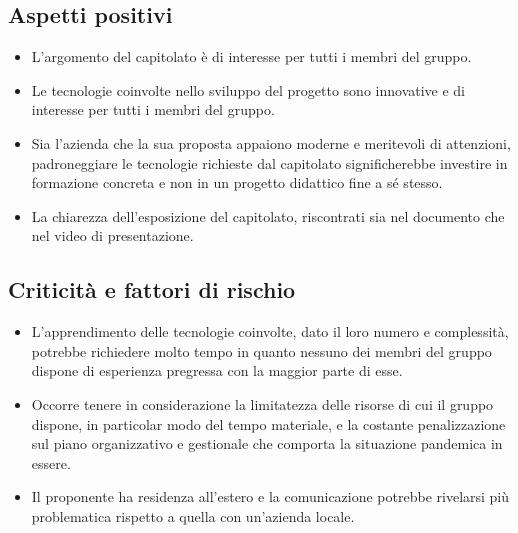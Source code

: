\subsection{Aspetti positivi}
\begin{itemize}
    \item L’argomento del capitolato è di interesse per tutti i membri del gruppo.
    \item Le tecnologie coinvolte nello sviluppo del progetto sono innovative e di interesse per tutti i membri del gruppo.
    \item Sia l’azienda che la sua proposta appaiono moderne e meritevoli di attenzioni, padroneggiare le tecnologie richieste dal capitolato significherebbe investire in formazione concreta e non in un progetto didattico fine a sé stesso.
    \item La chiarezza dell’esposizione del capitolato, riscontrati sia nel documento che nel video di presentazione.
\end{itemize}
\subsection{Criticità e fattori di rischio}
\begin{itemize}
    \item L’apprendimento delle tecnologie coinvolte, dato il loro numero e complessità, potrebbe richiedere molto tempo in quanto nessuno dei membri del gruppo dispone di esperienza pregressa con la maggior parte di esse.
    \item Occorre tenere in considerazione la limitatezza delle risorse di cui il gruppo dispone, in particolar modo del tempo materiale, e la costante penalizzazione sul piano organizzativo e gestionale che comporta la situazione pandemica in essere.
    \item Il proponente ha residenza all’estero e la comunicazione potrebbe rivelarsi più problematica rispetto a quella con un’azienda locale.
\end{itemize}
